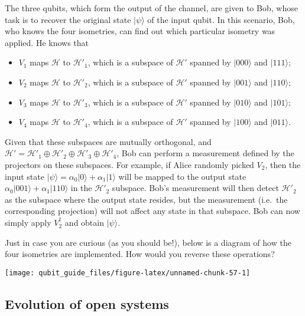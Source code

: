 \documentclass[fleqn]{article}
\providecommand{\tightlist}{%
  \setlength{\itemsep}{0pt}\setlength{\parskip}{0pt}}
\begin{document}
The three qubits, which form the output of the channel, are given to Bob, whose task is to recover the original state \(|\psi\rangle\) of the input qubit.
In this scenario, Bob, who knows the four isometries, can find out which particular isometry was applied.
He knows that

\begin{itemize}
\tightlist
\item
  \(V_1\) maps \(\mathcal{H}\) to \(\mathcal{H}'_1\), which is a subspace of \(\mathcal{H}'\) spanned by \(|000\rangle\) and \(|111\rangle\);
\item
  \(V_2\) maps \(\mathcal{H}\) to \(\mathcal{H}'_2\), which is a subspace of \(\mathcal{H}'\) spanned by \(|001\rangle\) and \(|110\rangle\);
\item
  \(V_3\) maps \(\mathcal{H}\) to \(\mathcal{H}'_3\), which is a subspace of \(\mathcal{H}'\) spanned by \(|010\rangle\) and \(|101\rangle\);
\item
  \(V_4\) maps \(\mathcal{H}\) to \(\mathcal{H}'_4\), which is a subspace of \(\mathcal{H}'\) spanned by \(|100\rangle\) and \(|011\rangle\).
\end{itemize}

Given that these subspaces are mutually orthogonal, and \(\mathcal{H}'=\mathcal{H}'_1\oplus\mathcal{H}'_2\oplus\mathcal{H}'_3\oplus\mathcal{H}'_4\), Bob can perform a measurement defined by the projectors on these subspaces.
For example, if Alice randomly picked \(V_2\), then the input state \(|\psi\rangle=\alpha_0|0\rangle+\alpha_1|1\rangle\) will be mapped to the output state \(\alpha_0|001\rangle+\alpha_1|110\rangle\) in the \(\mathcal{H}'_2\) subspace.
Bob's measurement will then detect \(\mathcal{H}'_2\) as the subspace where the output state resides, but the measurement (i.e.~the corresponding projection) will not affect any state in that subspace.
Bob can now simply apply \(V_2^\dagger\) and obtain \(|\psi\rangle\).

Just in case you are curious (as you should be!), below is a diagram of how the four isometries are implemented.
How would you reverse these operations?

\begin{center}\texttt{[image: qubit\_guide\_files/figure-latex/unnamed-chunk-57-1]} \end{center}

\hypertarget{evolution-of-open-systems}{%
\subsection{Evolution of open systems}\label{evolution-of-open-systems}}
\end{document}

